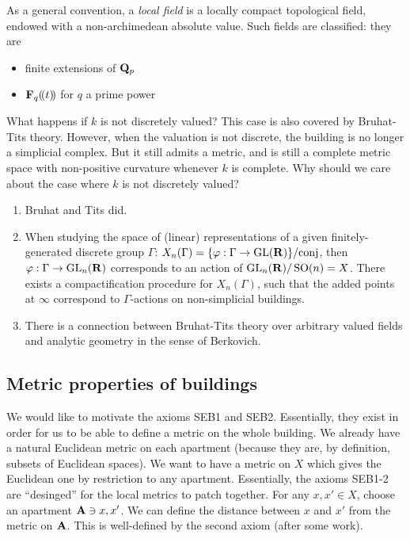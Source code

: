 \documentclass{article}
\begin{document}
As a general convention, a \emph{local field} is a locally compact 
topological field, endowed with a non-archimedean absolute value. Such 
fields are classified: they are 
\begin{itemize}
  \item finite extensions of $\mathbf{Q}_p$
  \item $\mathbf{F}_q(\! ( t )\! )$ for $q$ a prime power
\end{itemize}
What happens if $k$ is not discretely valued? This case is also covered by 
Bruhat-Tits theory. However, when the valuation is not discrete, the building 
is no longer a simplicial complex. But it still admits a metric, and is still 
a complete metric space with non-positive curvature whenever $k$ is complete. 
Why should we care about the case where $k$ is not discretely valued?
\begin{enumerate}
  \item Bruhat and Tits did.
  \item When studying the space of (linear) representations of a given finitely-generated 
    discrete group $\Gamma$: 
    $X_n(\Gamma)=\{\varphi:\Gamma \to \operatorname{GL}(\mathbf{R})\}/\text{conj}$, 
    then $\varphi:\Gamma \to \operatorname{GL}_n(\mathbf{R})$ corresponds to an action of 
    $\operatorname{GL}_n(\mathbf{R})/\operatorname{SO}(n)=X$. There exists a compactification 
    procedure for $X_n(\Gamma)$, such that the added points at $\infty$ 
    correspond to $\Gamma$-actions on non-simplicial buildings. 
  \item There is a connection between Bruhat-Tits theory over arbitrary valued 
    fields and analytic geometry in the sense of Berkovich. 
\end{enumerate}


\subsection{Metric properties of buildings}

We would like to motivate the axioms SEB1 and SEB2. Essentially, they 
exist in order for us to be able to define a metric on the whole building. We 
already have a natural Euclidean metric on each apartment (because they are, by 
definition, subsets of Euclidean spaces). We want to have a metric on $X$ which 
gives the Euclidean one by restriction to any apartment. Essentially, the 
axioms SEB1-2 are ``desinged'' for the local metrics to patch together. For any 
$x,x'\in X$, choose an apartment $\mathbf{A}\ni x,x'$. We can define the distance 
between $x$ and $x'$ from the metric on $\mathbf{A}$. This is well-defined by the second 
axiom (after some work). 
\end{document}

